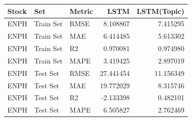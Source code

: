 \begin{tabular}{lllrr}
\toprule
Stock & Set & Metric & LSTM & LSTM(Topic) \\
\midrule
ENPH & Train Set & RMSE & 8.108867 & 7.415295 \\
ENPH & Train Set & MAE & 6.414485 & 5.613302 \\
ENPH & Train Set & R2 & 0.970081 & 0.974980 \\
ENPH & Train Set & MAPE & 3.419425 & 2.897019 \\
ENPH & Test Set & RMSE & 27.441454 & 11.156349 \\
ENPH & Test Set & MAE & 19.772029 & 8.315746 \\
ENPH & Test Set & R2 & -2.133398 & 0.482101 \\
ENPH & Test Set & MAPE & 6.505827 & 2.762469 \\
\bottomrule
\end{tabular}
